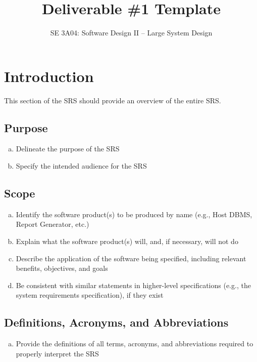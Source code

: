 \documentclass[]{article}
\title{Deliverable \#1 Template}
\author{SE 3A04: Software Design II -- Large System Design}
\date{}
\begin{document}
\maketitle

\section{Introduction}
\label{sec:introduction}

This section of the SRS should provide an overview of the entire SRS.

\subsection{Purpose}
\label{sub:purpose}
\begin{enumerate}[a)]
	\item Delineate the purpose of the SRS
	\item Specify the intended audience for the SRS
\end{enumerate}

\subsection{Scope}
\label{sub:scope}
\begin{enumerate}[a)]
	\item Identify the software product(s) to be produced by name (e.g., Host DBMS, 
Report Generator, etc.)
	\item Explain what the software product(s) will, and, if necessary, will not do
	\item Describe the application of the software being specified, including 
relevant benefits, objectives, and goals
	\item Be consistent with similar statements in higher-level specifications 
(e.g., the system requirements specification), if they exist
\end{enumerate}

\subsection{Definitions, Acronyms, and Abbreviations}
\label{sub:definitions_acronyms_and_abbreviations}
\begin{enumerate}[a)]
	\item Provide the definitions of all terms, acronyms, and abbreviations 
required to properly interpret the SRS
\end{enumerate}
\end{document}
